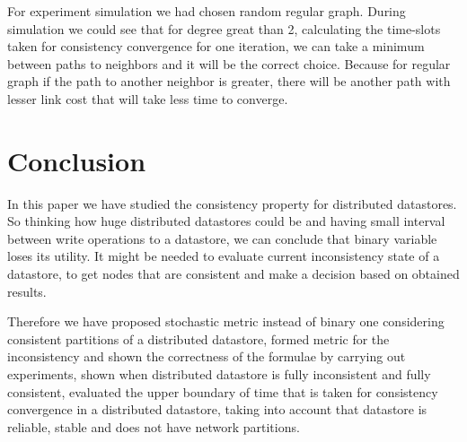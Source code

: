 \documentclass{llncs}
\begin{document}
%
For experiment simulation we had chosen random regular graph.
During simulation we could see that for degree great than 2, calculating the time-slots taken for consistency convergence for one iteration, we can take a minimum between paths to neighbors and it will be the correct choice. Because for regular graph if the path to another neighbor is greater, there will be another path with lesser link cost that will take less time to converge.
%
\section{Conclusion}
In this paper we have studied the consistency property for distributed datastores.
So thinking how huge distributed datastores could be and having small interval between write operations to a datastore, we can conclude that binary variable loses its utility.
It might be needed to evaluate current inconsistency state of a datastore, to get nodes that are consistent and make a decision based on obtained results.

Therefore we have proposed stochastic metric instead of binary one considering consistent partitions of a distributed datastore, formed metric for the inconsistency and shown the correctness of the formulae by carrying out experiments, shown when distributed datastore is fully inconsistent and fully consistent, evaluated the upper boundary of time that is taken for consistency convergence in a distributed datastore, taking into account that datastore is reliable, stable and does not have network partitions.
\end{document}
